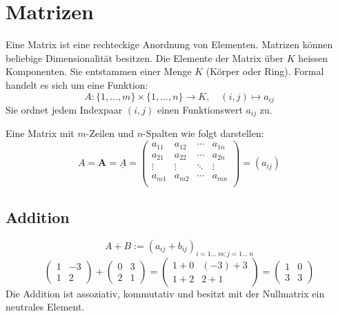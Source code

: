\section{Matrizen}
Eine Matrix ist eine rechteckige Anordnung von Elementen. Matrizen können beliebige Dimensionalität besitzen. Die Elemente der Matrix über $K$ heissen Komponenten. Sie entstammen einer Menge $K$ (Körper oder Ring). Formal handelt es sich um eine Funktion:
\begin{equation*}
	A: \{1,\ldots,m\}\times\{1,\dots,n\} \to K,\quad (i,j) \mapsto a_{ij}
\end{equation*}
Sie ordnet jedem Indexpaar $(i, j)$ einen Funktionswert $a_{ij}$ zu.

Eine Matrix mit $m$-Zeilen und $n$-Spalten wie folgt darstellen:
\begin{equation*}
A=\mathbf{A}=\underline{A}=\begin{pmatrix}
a_{11} & a_{12} & \cdots & a_{1n}\\
a_{21} & a_{22} & \cdots & a_{2n}\\
\vdots & \vdots & \ddots & \vdots\\
a_{m1} & a_{m2} & \cdots & a_{mn}\\
\end{pmatrix} = (a_{ij})
\end{equation*}
\subsection{Addition}
\begin{equation*}
	A + B := (a_{ij} + b_{ij})_{i=1\dots\ m; j=1\dots\ n}
\end{equation*}
\begin{equation*}
  \begin{pmatrix}
    1 & -3 \\
    1 & 2
  \end{pmatrix}
  +
  \begin{pmatrix}
    0 & 3 \\
    2 & 1
  \end{pmatrix}
  =
  \begin{pmatrix}
    1+0 & (-3)+3 \\
    1+2 & 2+1 
  \end{pmatrix}
  =
  \begin{pmatrix}
    1 & 0\\
    3 & 3
  \end{pmatrix}
\end{equation*}
Die Addition ist assoziativ, kommutativ und besitzt mit der Nullmatrix ein neutrales Element.

